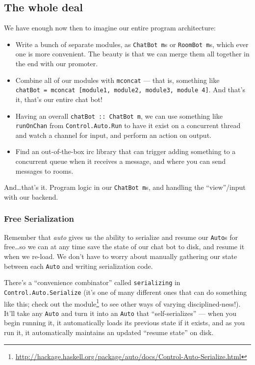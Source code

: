 \documentclass[]{article}
\renewcommand{\href}[2]{#2\footnote{\url{#1}}}
\begin{document}
\subsection{The whole deal}\label{the-whole-deal}

We have enough now then to imagine our entire program architecture:

\begin{itemize}
\tightlist
\item
  Write a bunch of separate modules, as \texttt{ChatBot\ m}s or
  \texttt{RoomBot\ m}s, which ever one is more convenient. The beauty is that we
  can merge them all together in the end with our promoter.
\item
  Combine all of our modules with \texttt{mconcat} --- that is, something like
  \texttt{chatBot\ =\ mconcat\ {[}module1,\ module2,\ module3,\ module\ 4{]}}.
  And that's it, that's our entire chat bot!
\item
  Having an overall \texttt{chatBot\ ::\ ChatBot\ m}, we can use something like
  \texttt{runOnChan} from \texttt{Control.Auto.Run} to have it exist on a
  concurrent thread and watch a channel for input, and perform an action on
  output.
\item
  Find an out-of-the-box irc library that can trigger adding something to a
  concurrent queue when it receives a message, and where you can send messages
  to rooms.
\end{itemize}

And\ldots that's it. Program logic in our \texttt{ChatBot\ m}s, and handling the
``view''/input with our backend.

\subsubsection{Free Serialization}\label{free-serialization}

Remember that \emph{auto} gives us the ability to serialize and resume our
\texttt{Auto}s for free\ldots so we can at any time save the state of our chat
bot to disk, and resume it when we re-load. We don't have to worry about
manually gathering our state between each \texttt{Auto} and writing
serialization code.

There's a ``convenience combinator'' called
\texttt{serializing\textquotesingle{}} in \texttt{Control.Auto.Serialize} (it's
one of many different ones that can do something like this;
\href{http://hackage.haskell.org/package/auto/docs/Control-Auto-Serialize.html}{check
out the module} to see other ways of varying disciplined-ness!). It'll take any
\texttt{Auto} and turn it into an \texttt{Auto} that ``self-serializes'' ---
when you begin running it, it automatically loads its previous state if it
exists, and as you run it, it automatically maintains an updated ``resume
state'' on disk.
\end{document}
